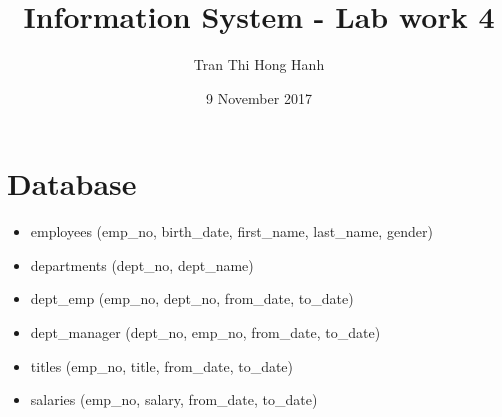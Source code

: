 \documentclass{article}
\title{Information System - Lab work 4}
\author{Tran Thi Hong Hanh}
\date{9 November 2017}
\begin{document}
\maketitle
\section*{Database}
\begin{itemize}
	\item employees (emp\_no, birth\_date, first\_name, last\_name, gender)
	\item departments (dept\_no, dept\_name)
	\item dept\_emp (emp\_no, dept\_no, from\_date, to\_date)
	\item dept\_manager (dept\_no, emp\_no, from\_date, to\_date)
	\item titles (emp\_no, title, from\_date, to\_date)
	\item salaries (emp\_no, salary, from\_date, to\_date)
\end{itemize}
\end{document}
